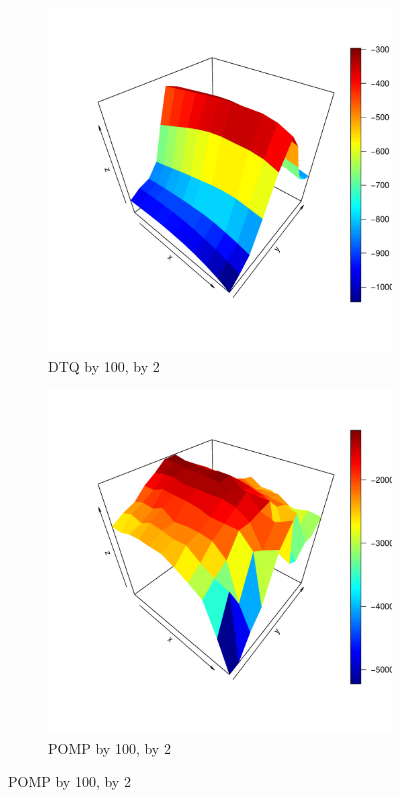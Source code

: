 \documentclass[a4paper,11pt]{article}
\begin{document}
\begin{figure}[H]
\medskip

\begin{subfigure}{0.48\textwidth}
\includegraphics[width=\linewidth]{dtq_by100_by2.pdf}
\caption{DTQ by 100, by 2} \label{fig:a}
\end{subfigure}\hspace*{\fill}
\begin{subfigure}{0.48\textwidth}
\includegraphics[width=\linewidth]{pomp_by100_by2.pdf}
\caption{POMP by 100, by 2} \label{fig:b}
\end{subfigure}


\end{figure}
\end{document}
